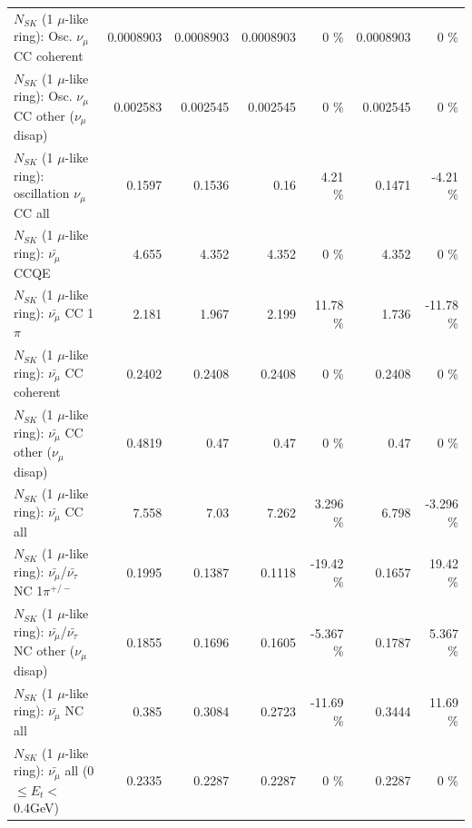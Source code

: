 \begin{table}
\begin{tabular}{| l | r | r | r  r | r  r |}
                        $N_{SK}$ (1 $\mu$-like ring): Osc. $\nu_\mu$ CC coherent &       0.0008903 &       0.0008903 &       0.0008903 &        0 \%  &       0.0008903 &        0 \%  \\ 
         $N_{SK}$ (1 $\mu$-like ring): Osc. $\nu_\mu$ CC other ($\nu_\mu$ disap) &        0.002583 &        0.002545 &        0.002545 &        0 \%  &        0.002545 &        0 \%  \\ 
                      $N_{SK}$ (1 $\mu$-like ring): oscillation $\nu_\mu$ CC all &          0.1597 &          0.1536 &            0.16 &     4.21 \%  &          0.1471 &    -4.21 \%  \\ 
\hline
\hline
                              $N_{SK}$ (1 $\mu$-like ring): $\bar{\nu_\mu}$ CCQE &           4.655 &           4.352 &           4.352 &        0 \%  &           4.352 &        0 \%  \\ 
                         $N_{SK}$ (1 $\mu$-like ring): $\bar{\nu_\mu}$ CC 1$\pi$ &           2.181 &           1.967 &           2.199 &    11.78 \%  &           1.736 &   -11.78 \%  \\ 
                       $N_{SK}$ (1 $\mu$-like ring): $\bar{\nu_\mu}$ CC coherent &          0.2402 &          0.2408 &          0.2408 &        0 \%  &          0.2408 &        0 \%  \\ 
        $N_{SK}$ (1 $\mu$-like ring): $\bar{\nu_\mu}$ CC other ($\nu_\mu$ disap) &          0.4819 &            0.47 &            0.47 &        0 \%  &            0.47 &        0 \%  \\ 
                          $N_{SK}$ (1 $\mu$-like ring): $\bar{\nu_{\mu}}$ CC all &           7.558 &            7.03 &           7.262 &    3.296 \%  &           6.798 &   -3.296 \%  \\ 
\hline
  $N_{SK}$ (1 $\mu$-like ring): $\bar{\nu_\mu}$/$\bar{\nu_\tau}$ NC 1$\pi^{+/-}$ &          0.1995 &          0.1387 &          0.1118 &   -19.42 \%  &          0.1657 &    19.42 \%  \\ 
$N_{SK}$ (1 $\mu$-like ring): $\bar{\nu_\mu}$/$\bar{\nu_\tau}$ NC other ($\nu_\mu$ disap) &          0.1855 &          0.1696 &          0.1605 &   -5.367 \%  &          0.1787 &    5.367 \%  \\ 
                          $N_{SK}$ (1 $\mu$-like ring): $\bar{\nu_{\mu}}$ NC all &           0.385 &          0.3084 &          0.2723 &   -11.69 \%  &          0.3444 &    11.69 \%  \\ 
\hline
   $N_{SK}$ (1 $\mu$-like ring): $\bar{\nu_{\mu}}$ all (0 $\leq E_{t} <$ 0.4GeV) &          0.2335 &          0.2287 &          0.2287 &        0 \%  &          0.2287 &        0 \%  \\ 

\end{tabular}
\end{table}
